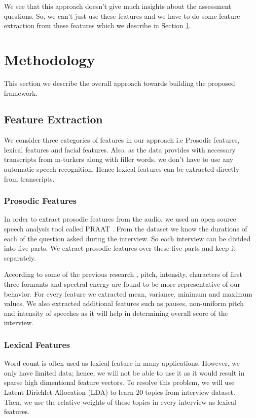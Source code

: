 \documentclass[11pt]{article}
\begin{document}
We see that this approach doesn't give much insights about the assessment questions. So, we can't just use these features and we have to do some feature extraction from these features which we describe in Section \ref{sec:methodology}.

\section{Methodology}
\label{sec:methodology}
This section we describe the overall approach towards building the proposed framework.

\subsection{Feature Extraction}
We consider three categories of features in our approach i.e Prosodic features, lexical features and facial features. Also, as the data provides with necessary transcripts from m-turkers along with filler words, we don't have to use any automatic speech recognition. Hence lexical features can be extracted directly from transcripts.
\subsubsection{Prosodic Features}
In order to extract prosodic features from the audio, we used an open source speech analysis tool called PRAAT \cite{naim2015automated}. From the dataset we know the durations of each of the question asked during the interview. So each interview can be divided into five parts. We extract prosodic features over these five parts and keep it separately.

According to some of the previous research \cite{frick1985communicating}, pitch, intensity, characters of first three formants and spectral energy are found to be more representative of our behavior. For every feature we extracted mean, variance, minimum and maximum values. We also extracted additional features such as pauses, non-uniform pitch and intensity of speeches as it will help in determining overall score of the interview.
\subsubsection{Lexical Features}
Word count is often used as lexical feature in many applications. However, we only have limited data; hence, we will not be able to use it as it would result in sparse high dimentional feature vectors. To resolve this problem, we will use Latent Dirichlet Allocation (LDA) to learn 20 topics from interview dataset. Then, we use the relative weights of these topics in every interview as lexical features.
\end{document}
